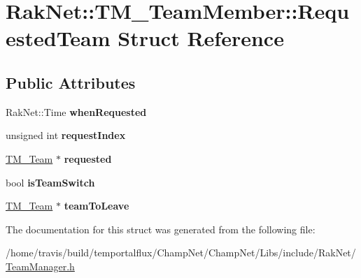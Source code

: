 \hypertarget{struct_rak_net_1_1_t_m___team_member_1_1_requested_team}{\section{Rak\-Net\-:\-:T\-M\-\_\-\-Team\-Member\-:\-:Requested\-Team Struct Reference}
\label{struct_rak_net_1_1_t_m___team_member_1_1_requested_team}
}
\subsection*{Public Attributes}
\begin{DoxyCompactItemize}
\item 
\hypertarget{struct_rak_net_1_1_t_m___team_member_1_1_requested_team_ae34c38000f469eeddc1241f962b88819}{Rak\-Net\-::\-Time {\bfseries when\-Requested}}\label{struct_rak_net_1_1_t_m___team_member_1_1_requested_team_ae34c38000f469eeddc1241f962b88819}

\item 
\hypertarget{struct_rak_net_1_1_t_m___team_member_1_1_requested_team_a30826e88cf8d4702084e18afc8aa06ff}{unsigned int {\bfseries request\-Index}}\label{struct_rak_net_1_1_t_m___team_member_1_1_requested_team_a30826e88cf8d4702084e18afc8aa06ff}

\item 
\hypertarget{struct_rak_net_1_1_t_m___team_member_1_1_requested_team_a3220965d6acc244c28def696390ca979}{\hyperlink{class_rak_net_1_1_t_m___team}{T\-M\-\_\-\-Team} $\ast$ {\bfseries requested}}\label{struct_rak_net_1_1_t_m___team_member_1_1_requested_team_a3220965d6acc244c28def696390ca979}

\item 
\hypertarget{struct_rak_net_1_1_t_m___team_member_1_1_requested_team_a657ddf38b5217d12510b26a3f3417e33}{bool {\bfseries is\-Team\-Switch}}\label{struct_rak_net_1_1_t_m___team_member_1_1_requested_team_a657ddf38b5217d12510b26a3f3417e33}

\item 
\hypertarget{struct_rak_net_1_1_t_m___team_member_1_1_requested_team_a9892f739d2072146f9d1e7f977a55bf3}{\hyperlink{class_rak_net_1_1_t_m___team}{T\-M\-\_\-\-Team} $\ast$ {\bfseries team\-To\-Leave}}\label{struct_rak_net_1_1_t_m___team_member_1_1_requested_team_a9892f739d2072146f9d1e7f977a55bf3}

\end{DoxyCompactItemize}


The documentation for this struct was generated from the following file\-:\begin{DoxyCompactItemize}
\item 
/home/travis/build/temportalflux/\-Champ\-Net/\-Champ\-Net/\-Libs/include/\-Rak\-Net/\hyperlink{_team_manager_8h}{Team\-Manager.\-h}\end{DoxyCompactItemize}
